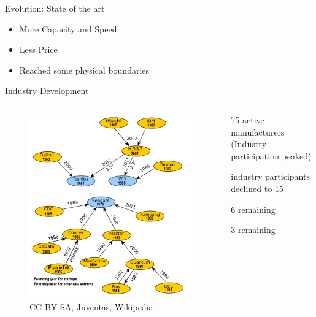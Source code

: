 \documentclass[12pt]{beamer}
\newlength{\wideitemsep}
\let\olditem\item
\renewcommand{\item}{\setlength{\itemsep}{\wideitemsep}\olditem}
\begin{document}
\begin{frame}[fragile]{Evolution: State of the art}
	\begin{itemize}
		\item More Capacity and Speed
		\item Less Price
		\item Reached some physical boundaries
	\end{itemize}
\end{frame}

\begin{frame}[fragile]{Industry Development}

	\begin{columns}[c]
	\begin{column}[c]{.5\textwidth}	
 		\begin{figure}[p]
	 		\centering
	 		\includegraphics[width=\linewidth]{img/diagram_manufacturer.png}
	 			\caption{CC BY-SA, Juventas, Wikipedia}
 		\end{figure}
 	\end{column}
 	
 	\begin{column}[c]{.5\textwidth}	
 		\begin{description}
 			\item[1985] 75 active manufacturers (Industry participation peaked)
			\item[1999] industry participants declined to 15
			\item[2009] 6 remaining
			\item[2012] 3 remaining
 		\end{description}
 	\end{column}
 	\end{columns}
 	
\end{frame}
\end{document}

